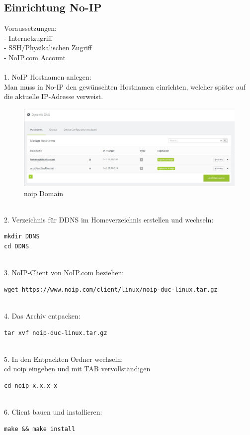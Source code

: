 \subsection{Einrichtung No-IP}
Voraussetzungen:\\
- Internetzugriff\\
- SSH/Physikalischen Zugriff\\
- NoIP.com Account\\
\\
1. NoIP Hostnamen anlegen:\\
Man muss in No-IP den gewünschten Hostnamen einrichten, welcher später auf die aktuelle IP-Adresse verweist.\\
\begin{figure}[ht]
\includegraphics[width=\textwidth]{pictures/Jonas/noip_Domain}
\caption{noip Domain}
\end{figure}
~\\
2. Verzeichnis für DDNS im Homeverzeichnis erstellen und wechseln:
\begin{lstlisting}
mkdir DDNS
cd DDNS
\end{lstlisting}
~\\
3. NoIP-Client von NoIP.com beziehen:
\begin{lstlisting}
wget https://www.noip.com/client/linux/noip-duc-linux.tar.gz
\end{lstlisting}
~\\
4. Das Archiv entpacken:
\begin{lstlisting}
tar xvf noip-duc-linux.tar.gz
\end{lstlisting}
~\\
5. In den Entpackten Ordner wechseln:\\
cd noip eingeben und mit TAB vervollständigen
\begin{lstlisting}
cd noip-x.x.x-x 
\end{lstlisting}
~\\
6. Client bauen und installieren:
\begin{lstlisting}
make && make install
\end{lstlisting}
